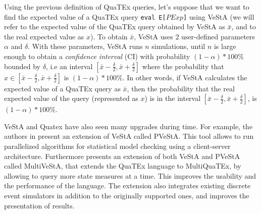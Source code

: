 Using the previous definition of QuaTEx queries, let's suppose that we want to find the expected value of a QuaTEx query \texttt{eval E[$PExp$]} using VeStA (we will refer to the expected value of the QuaTEx query obtained by VeStA as $\bar{x}$, and to the real expected value as $x$). To obtain $\bar{x}$, VeStA uses 2 user-defined parameters $\alpha$ and $\delta$. With these parameters, VeStA runs $n$ simulations, until $n$ is large enough to obtain a \textit{confidence interval} (CI) with probability $(1-\alpha) * 100\%$ bounded by $\delta$, i.e an interval $[\bar{x} - \frac{\delta}{2},\bar{x} + \frac{\delta}{2}]$ where the probability that $x \in [\bar{x} - \frac{\delta}{2},\bar{x} + \frac{\delta}{2}]$ is $(1-\alpha) * 100\%$. In other words, if VeStA calculates the expected value of a QuaTEx query as $\bar{x}$, then the probability that the real expected value of the query (represented as $x$) is in the interval $[\bar{x} - \frac{\delta}{2},\bar{x} + \frac{\delta}{2}]$, is $(1-\alpha) * 100\%$.

VeStA and Quatex have also seen many upgrades during time. For example, the authors in \cite{AlTurki2011} present an extension of VeStA called PVeStA. This tool allows to run parallelized algorithms for statistical model checking using a client-server architecture. Furthermore \cite{multivesta} presents an extension of both VeStA and PVeStA called MultiVeStA, that extends the QuaTEx language to MultiQuaTEx, by allowing to query more state measures at a time. This improves the usability and the performance of the language. The extension also integrates existing discrete event simulators in addition to the originally supported ones, and improves the presentation of results.

